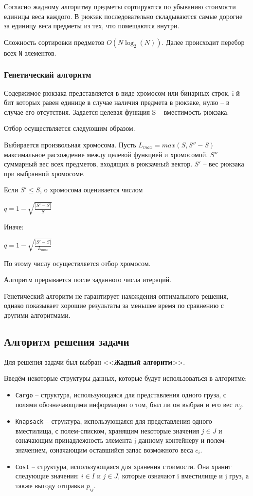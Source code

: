 \documentclass[14pt,a4paper]{extarticle}
\begin{document}
	Согласно жадному алгоритму предметы сортируются по убыванию стоимости единицы веса каждого. В рюкзак последовательно складываются самые дорогие за единицу веса предметы из тех, что помещаются внутри.
	
	Сложность сортировки предметов $O(N\log_2(N))$. Далее происходит перебор всех \texttt{N} элементов.
	
	\subsubsection{Генетический алгоритм}
	
	Содержимое рюкзака представляется в виде хромосом или бинарных строк, i-й бит которых равен единице в случае наличия предмета в рюкзаке, нулю -- в случае его отсутствия. Задается целевая функция S -- вместимость рюкзака.
	
	Отбор осуществляется следующим образом.
	
	Выбирается произвольная хромосома. Пусть $L_{max} = max(S, S'' - S)$ максимальное расхождение между целевой функцией и хромосомой. $S''$ суммарный вес всех предметов, входящих в рюкзачный вектор. $S'$ -- вес рюкзака при выбранной хромосоме.
	
	Если $S' \le S$, о хромосома оценивается числом 
	
	$q = 1 - \sqrt{\frac{|S' - S|}{S}}$
	
	Иначе:
	
	$q = 1 - \sqrt{\frac{|S' - S|}{L_{max}}}$
	
	По этому числу осуществляется отбор хромосом.
	
	Алгоритм прерывается после заданного числа итераций.

	Генетический алгоритм не гарантирует нахождения оптимального решения, однако показывает хорошие результаты за меньшее время по сравнению с другими алгоритмами.

\subsection{Алгоритм решения задачи}

	Для решения задачи был выбран <<\textbf{Жадный алгоритм}>>.
	
	Введём некоторые структуры данных, которые будут использоваться в алгоритме:
	\begin{itemize}
		\item \texttt{Cargo} -- структура, использующаяся для представления одного груза, с полями обозначающими информацию о том, был ли он выбран и его вес $w_j$.
		\item \texttt{Knapsack} -- структура, использующаяся для представления одного вместилища, с полем-списком, хранящим некоторые значения $j \in J$ и означающим принадлежность элемента j данному контейнеру и полем-значением, означающим оставшийся запас возможного веса $c_i$.
		\item \texttt{Cost} -- структура, использующаяся для хранения стоимости. Она хранит следующие значения: $i \in I$ и $j \in J$, которые означают i вместилище и j груз, а также выгоду отправки $p_{ij}$.
	\end{itemize}
	
\end{document}
